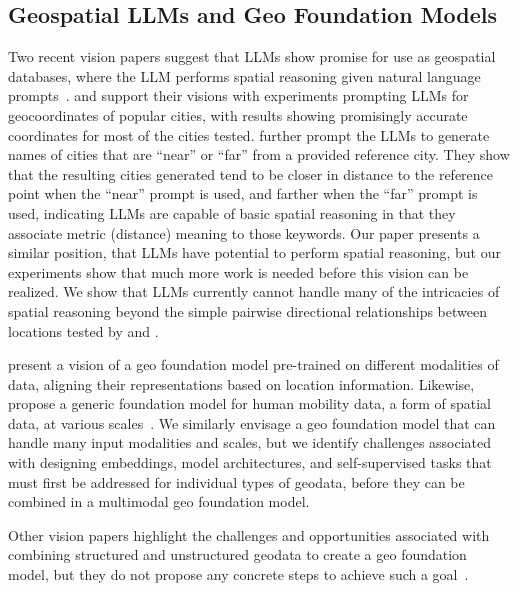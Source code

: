 \subsection{Geospatial LLMs and Geo Foundation Models}
Two recent vision papers suggest that LLMs show promise for use as geospatial databases, where the LLM performs spatial reasoning given natural language prompts~\cite{Bhandari2023, Qi2023}.
\citeauthor{Bhandari2023} and \citeauthor{Qi2023} support their visions with experiments prompting LLMs for geocoordinates of popular cities, with results showing promisingly accurate coordinates for most of the cities tested.
\citeauthor{Bhandari2023} further prompt the LLMs to generate names of cities that are ``near'' or ``far'' from a provided reference city.
They show that the resulting cities generated tend to be closer in distance to the reference point when the ``near'' prompt is used, and farther when the ``far'' prompt is used, indicating LLMs are capable of basic spatial reasoning in that they associate metric (distance) meaning to those keywords.
%
%
Our paper presents a similar position, that LLMs have potential to perform spatial reasoning, but our experiments show that much more work is needed before this vision can be realized.
We show that LLMs currently cannot handle many of the intricacies of spatial reasoning beyond the simple pairwise directional relationships between locations tested by \citeauthor{Bhandari2023} and \citeauthor{Qi2023}.

\citeauthor{Mai2023} present a vision of a geo foundation model pre-trained on different modalities of data, aligning their representations based on location information.
Likewise, \citeauthor{Fei2022} propose a generic foundation model for human mobility data, a form of spatial data, at various scales~\cite{Fei2022}.
%
%
We similarly envisage a geo foundation model that can handle many input modalities and scales, but we identify challenges associated with designing embeddings, model architectures, and self-supervised tasks that must first be addressed for individual types of geodata, before they can be combined in a multimodal geo foundation model.

Other vision papers highlight the challenges and opportunities associated with combining structured and unstructured geodata to create a geo foundation model, but they do not propose any concrete steps to achieve such a goal~\cite{Xie2023, Tan2023}.

